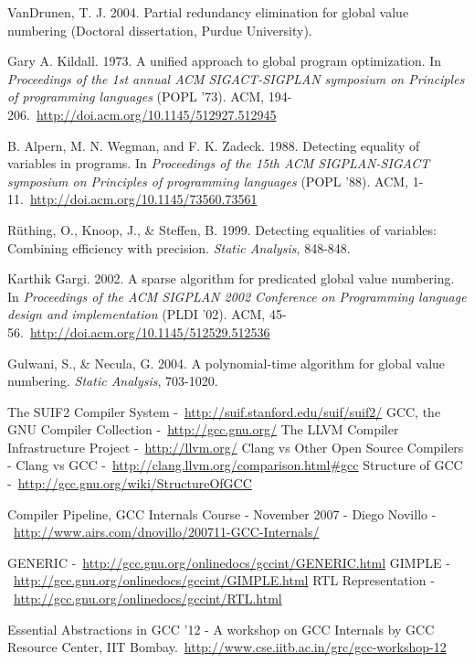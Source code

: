 \cleardoublepage
{}
{}
\begin{thebibliography}{99}

VanDrunen, T. J. 2004. Partial redundancy elimination for global value numbering (Doctoral dissertation, Purdue University).

Gary A. Kildall. 1973. A unified approach to global program optimization. In \emph{Proceedings of the 1st annual ACM SIGACT-SIGPLAN symposium on Principles of programming languages} (POPL '73). ACM, 194-206.\ \url{http://doi.acm.org/10.1145/512927.512945}

B. Alpern, M. N. Wegman, and F. K. Zadeck. 1988. Detecting equality of variables in programs. In \emph{Proceedings of the 15th ACM SIGPLAN-SIGACT symposium on Principles of programming languages} (POPL '88). ACM, 1-11.\ \url{http://doi.acm.org/10.1145/73560.73561}

R\"uthing, O., Knoop, J., \& Steffen, B. 1999. Detecting equalities of variables: Combining efficiency with precision. \emph{Static Analysis}, 848-848.

Karthik Gargi. 2002. A sparse algorithm for predicated global value numbering. In \emph{Proceedings of the ACM SIGPLAN 2002 Conference on Programming language design and implementation} (PLDI '02). ACM, 45-56.\ \url{http://doi.acm.org/10.1145/512529.512536}

Gulwani, S., \& Necula, G. 2004. A polynomial-time algorithm for global value numbering. \emph{Static Analysis}, 703-1020.

The SUIF2 Compiler System -\ \url{http://suif.stanford.edu/suif/suif2/}
GCC, the GNU Compiler Collection -\ \url{http://gcc.gnu.org/}
The LLVM Compiler Infrastructure Project -\ \url{http://llvm.org/}
Clang vs Other Open Source Compilers - Clang vs GCC -\ \url{http://clang.llvm.org/comparison.html#gcc}
Structure of GCC -\ \url{http://gcc.gnu.org/wiki/StructureOfGCC}

Compiler Pipeline, GCC Internals Course - November 2007 - Diego Novillo -\ \url{http://www.airs.com/dnovillo/200711-GCC-Internals/}

GENERIC -\ \url{http://gcc.gnu.org/onlinedocs/gccint/GENERIC.html}
GIMPLE -\ \url{http://gcc.gnu.org/onlinedocs/gccint/GIMPLE.html}
RTL Representation -\ \url{http://gcc.gnu.org/onlinedocs/gccint/RTL.html}

Essential Abstractions in GCC '12 - A workshop on GCC Internals by GCC Resource Center, IIT Bombay.\ \url{http://www.cse.iitb.ac.in/grc/gcc-workshop-12}

\end{thebibliography}
